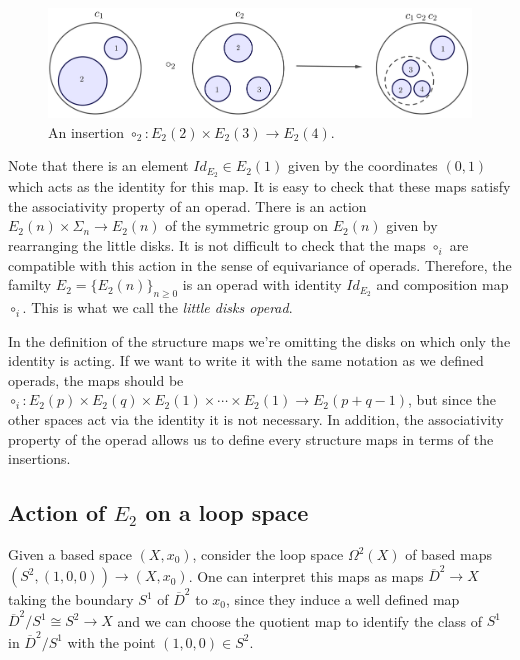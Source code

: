 \documentclass[TFM.tex]{subfiles}
\begin{document}
  
  \begin{figure}[h!]
  \centering
\includegraphics[scale=0.3]{Imagenes/insertion}
\caption{An insertion $\circ_2:E_2(2)\times E_2(3)\to E_2(4)$.}
 \end{figure}

Note that there is an element $Id_{E_2}\in E_2(1)$ given by the coordinates $(0,1)$ which acts as the identity for this map. It is easy to check that these maps satisfy the associativity property of an operad. There is an action $E_2(n)\times \Sigma_n\to E_2(n)$ of the symmetric group on $E_2(n)$ given by rearranging the little disks. It is not difficult to check that the maps $\circ_i$ are compatible with this action in the sense of equivariance of operads. Therefore, the familty $E_2=\{E_2(n)\}_{n\geq 0}$ is an operad with identity $Id_{E_2}$ and composition map $\circ_i$. This is what we call the \emph{little disks operad}.

\begin{remark}
In the definition of the structure maps we're omitting the disks on which only the identity is acting. If we want to write it with the same notation as we defined operads, the maps should be $\circ_i:E_2(p)\times E_2(q)\times E_2(1)\times\cdots \times E_2(1)\to E_2(p+q-1)$, but since the other spaces act via the identity it is not necessary. In addition, the associativity property of the operad allows us to define every structure maps in terms of the insertions. 
\end{remark}




\subsection{Action of $E_2$ on a loop space}
Given a based space $(X,x_0)$, consider the loop space $\Omega^2(X)$ of based maps $(S^2, (1,0,0))\to (X, x_0)$. One can interpret this maps as maps $\overline{D}^2\to X$ taking the boundary $S^1$ of $\overline{D}^2$ to $x_0$, since they induce a well defined map $\overline{D}^2/S^1\cong S^2\to X$ and we can choose the quotient map to identify the class of $S^1$ in $\overline{D}^2/S^1$ with the point $(1,0,0)\in S^2$. 
\end{document}
